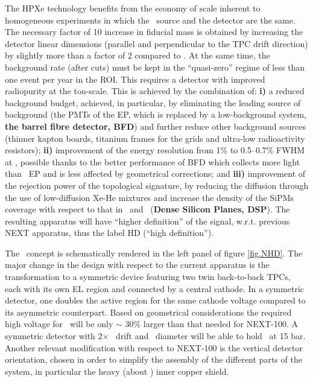 
 The HPXe technology benefits from the economy of scale inherent to homogeneous experiments in which the \bbonu\ source and the detector are the same. The necessary factor of 10 increase in fiducial mass is obtained by increasing the detector linear dimensions (parallel and perpendicular to the TPC drift direction) by slightly more than a factor of 2 compared to \NEXT. At the same time, the background rate (after cuts) must be kept in the ``quasi-zero'' regime of less than one event per year in the ROI. This requires a detector with improved radiopurity at the ton-scale. This is achieved by the combination of: {\bf i)} a reduced background budget, achieved, in particular, by eliminating the leading source of background (the PMTs of the EP, which is replaced by a low-background system, {\bf the barrel fibre detector, BFD}) and further reduce other background sources (thinner kapton boards, titanium frames for the grids and ultra-low radioactivity resistors);  {\bf ii)} improvement of the energy resolution from 1\% to 0.5--0.7\% FWHM at \Qbb, possible thanks to the better  performance of BFD which collects more light than \Next\ EP and is less affected by geometrical corrections; and {\bf iii)} improvement of the rejection power of the topological signature, by reducing the diffusion through the use of low-diffusion Xe-He mixtures and increase the density of the SiPMs coverage with respect to that in \NEW\ and \Next\ ({\bf Dense Silicon Planes, DSP}). The resulting apparatus will have ``higher definition'' of the signal, w.r.t. previous NEXT apparatus, thus the label HD (``high definition''). 
 
 \indent
 
The \NHD\ concept is schematically rendered in the left panel of figure \ref{fig.NHD}. %
The major change in the design with respect to the current apparatus is the transformation to a symmetric device featuring two twin back-to-back TPCs, each  with its own EL region and connected by a central cathode. In a symmetric detector, one doubles the active region for the same cathode voltage compared to its asymmetric counterpart.  Based on geometrical considerations the required high voltage for \NHD\ will be only $\sim$ 30\% larger than that needed for NEXT-100. A symmetric detector with 2$\times$ \XHDL\ drift and \XHDD\ diameter will be able to hold \XHDM\ at 15 bar. Another relevant modification with respect to NEXT-100 is the vertical detector orientation, chosen in order to simplify the assembly of the different parts of the system, in particular the heavy (about \XHDS) inner copper shield. 

